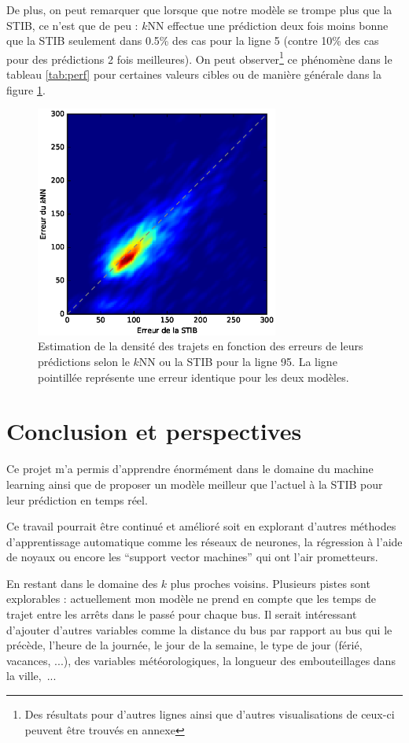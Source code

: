 \documentclass[letterpaper]{article}
\begin{document}
De plus, on peut remarquer que lorsque que notre modèle se trompe plus que la STIB, ce n'est que de peu : $k$NN effectue une prédiction deux fois moins bonne que la STIB seulement dans 0.5\% des cas pour la ligne 5 (contre 10\% des cas pour des prédictions 2 fois meilleures). On peut observer\footnote{Des résultats pour d'autres lignes ainsi que d'autres visualisations de ceux-ci peuvent être trouvés en annexe} ce phénomène dans le tableau \ref{tab:perf} pour certaines valeurs cibles ou de manière générale dans la figure \ref{fig:heatmap}.

\begin{figure}[h]
   \centerline{\includegraphics[width=8cm]{error-heatmap.eps}}
   \caption{\label{fig:heatmap} Estimation de la densité des trajets en fonction des erreurs de leurs prédictions selon le $k$NN ou la STIB pour la ligne 95. La ligne pointillée représente une erreur identique pour les deux modèles.}
\end{figure}



\section{Conclusion et perspectives}

Ce projet m'a permis d'apprendre énormément dans le domaine du machine learning ainsi que de proposer un modèle meilleur que l'actuel à la STIB pour leur prédiction en temps réel.

Ce travail pourrait être continué et amélioré soit en explorant d'autres méthodes d'apprentissage automatique comme les réseaux de neurones, la régression à l'aide de noyaux ou encore les ``support vector machines'' qui ont l'air prometteurs.

En restant dans le domaine des $k$ plus proches voisins. Plusieurs pistes sont explorables :
actuellement mon modèle ne prend en compte que les temps de trajet entre les arrêts dans le passé pour chaque bus.
Il serait intéressant d'ajouter d'autres variables comme la distance du bus par rapport au bus qui le précède, l'heure de la journée, le jour de la semaine, le type de jour (férié, vacances, ...), des variables météorologiques, la longueur des embouteillages dans la ville,~...
\end{document}
